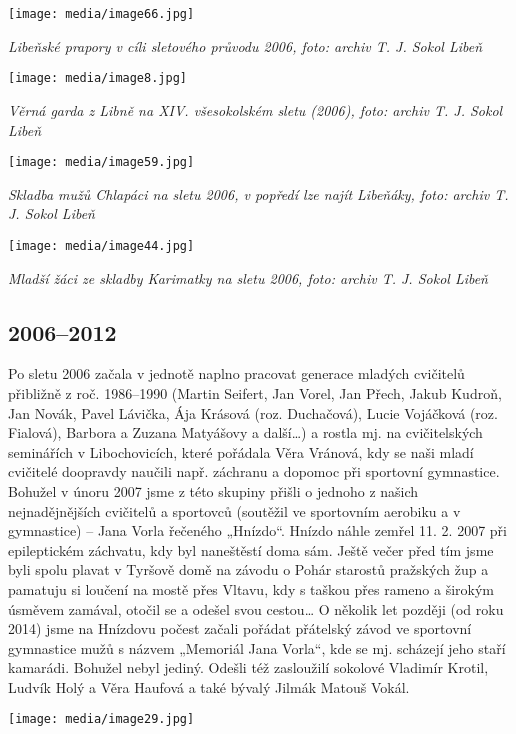 \texttt{[image: media/image66.jpg]}

\emph{Libeňské prapory v cíli sletového průvodu 2006, foto: archiv T. J.
Sokol Libeň}

\texttt{[image: media/image8.jpg]}

\emph{Věrná garda z Libně na XIV. všesokolském sletu (2006), foto:
archiv T. J. Sokol Libeň}

\texttt{[image: media/image59.jpg]}

\emph{Skladba mužů Chlapáci na sletu 2006, v popředí lze najít Libeňáky,
foto: archiv T. J. Sokol Libeň}

\texttt{[image: media/image44.jpg]}

\emph{Mladší žáci ze skladby Karimatky na sletu 2006, foto: archiv T. J.
Sokol Libeň}

\subsection{2006--2012}\label{section-1}

Po sletu 2006 začala v jednotě naplno pracovat generace mladých
cvičitelů přibližně z roč. 1986--1990 (Martin Seifert, Jan Vorel, Jan
Přech, Jakub Kudroň, Jan Novák, Pavel Lávička, Ája Krásová (roz.
Duchačová), Lucie Vojáčková (roz. Fialová), Barbora a Zuzana Matyášovy a
další\ldots) a rostla mj. na cvičitelských seminářích v Libochovicích,
které pořádala Věra Vránová, kdy se naši mladí cvičitelé doopravdy
naučili např. záchranu a dopomoc při sportovní gymnastice. Bohužel v
únoru 2007 jsme z této skupiny přišli o jednoho z našich nejnadějnějších
cvičitelů a sportovců (soutěžil ve sportovním aerobiku a v gymnastice)
-- Jana Vorla řečeného „Hnízdo``. Hnízdo náhle zemřel 11. 2. 2007 při
epileptickém záchvatu, kdy byl naneštěstí doma sám. Ještě večer před tím
jsme byli spolu plavat v Tyršově domě na závodu o Pohár starostů
pražských žup a pamatuju si loučení na mostě přes Vltavu, kdy s taškou
přes rameno a širokým úsměvem zamával, otočil se a odešel svou
cestou\ldots{} O několik let později (od roku 2014) jsme na Hnízdovu
počest začali pořádat přátelský závod ve sportovní gymnastice mužů s
názvem „Memoriál Jana Vorla``, kde se mj. scházejí jeho staří kamarádi.
Bohužel nebyl jediný. Odešli též zasloužilí sokolové Vladimír Krotil,
Ludvík Holý a Věra Haufová a také bývalý Jilmák Matouš Vokál.

\texttt{[image: media/image29.jpg]}


